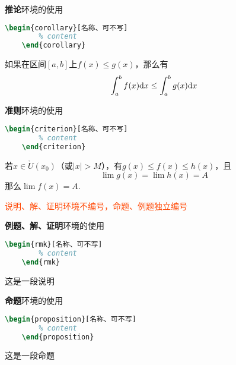 \documentclass[12pt, a4paper, oneside, UTF8]{ctexbook}
\begin{document}

\textbf{推论}环境的使用
\begin{lstlisting}[language=TeX]
    \begin{corollary}[名称、可不写]
        % content
    \end{corollary}
\end{lstlisting}

\begin{corollary}
    如果在区间$[a,b]$上$f(x)\le g(x)$，那么有
    \[
        \int_{a}^{b}f(x)\mathrm{d} x \le \int_{a}^{b}g(x)\mathrm{d} x
    \]
\end{corollary}


\textbf{准则}环境的使用
\begin{lstlisting}[language=TeX]
    \begin{criterion}[名称、可不写]
        % content
    \end{criterion}
\end{lstlisting}

\begin{criterion}[夹逼准则]
    若$x \in \mathring{U}(x_0)$（或$|x|>M$），有$g(x)\le f(x) \le h(x)$，且
    \[
        \lim g(x) = \lim h(x) = A
    \]
    那么$\lim f(x)=A$.
\end{criterion}


\textcolor{OrangeRed}{说明、解、证明环境不编号，命题、例题独立编号}

\textbf{例题、解、证明}环境的使用
\begin{lstlisting}[language=TeX]
    \begin{rmk}[名称、可不写]
        % content
    \end{rmk}
\end{lstlisting}

\begin{remark}
    这是一段说明
\end{remark}


\textbf{命题}环境的使用
\begin{lstlisting}[language=TeX]
    \begin{proposition}[名称、可不写]
        % content
    \end{proposition}
\end{lstlisting}

\begin{proposition}
    这是一段命题
\end{proposition}
\end{document}

